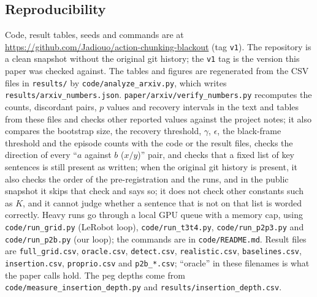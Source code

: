 \documentclass[11pt]{article}
\newcommand{\repourl}{\url{https://github.com/Jadiouo/action-chunking-blackout}}
\newcommand{\repocommit}{\texttt{v1}}
\begin{document}
\subsection{Reproducibility}\label{app:repro}
Code, result tables, seeds and commands are at \repourl{} (tag \repocommit{}). The repository is a clean snapshot without the original git history; the \texttt{v1} tag is the version this paper was checked against. The tables and figures are regenerated from the CSV files in \texttt{results/} by \texttt{code/analyze\_arxiv.py}, which writes \texttt{results/arxiv\_numbers.json}. \texttt{paper/arxiv/verify\_numbers.py} recomputes the counts, discordant pairs, $p$ values and recovery intervals in the text and tables from these files and checks other reported values against the project notes; it also compares the bootstrap size, the recovery threshold, $\gamma$, $\epsilon$, the black-frame threshold and the episode counts with the code or the result files, checks the direction of every ``$a$ against $b$ ($x/y$)'' pair, and checks that a fixed list of key sentences is still present as written; when the original git history is present, it also checks the order of the pre-registration and the runs, and in the public snapshot it skips that check and says so; it does not check other constants such as $K$, and it cannot judge whether a sentence that is not on that list is worded correctly. Heavy runs go through a local GPU queue with a memory cap, using \texttt{code/run\_grid.py} (LeRobot loop), \texttt{code/run\_t3t4.py}, \texttt{code/run\_p2p3.py} and \texttt{code/run\_p2b.py} (our loop); the commands are in \texttt{code/README.md}. Result files are \texttt{full\_grid.csv}, \texttt{oracle.csv}, \texttt{detect.csv}, \texttt{realistic.csv}, \texttt{baselines.csv}, \texttt{insertion.csv}, \texttt{proprio.csv} and \texttt{p2b\_*.csv}; ``oracle'' in these filenames is what the paper calls hold. The peg depths come from \texttt{code/measure\_insertion\_depth.py} and \texttt{results/insertion\_depth.csv}.
\end{document}
